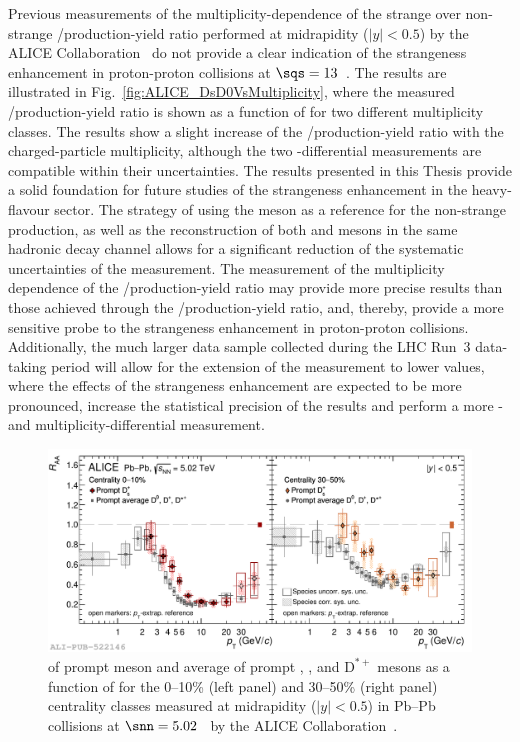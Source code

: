 Previous measurements of the multiplicity-dependence of the strange over non-strange \ds/\dz production-yield ratio performed at midrapidity ($\lvert y\rvert<0.5$) by the ALICE Collaboration~\cite{ALICE:2021npz} do not provide a clear indication of the strangeness enhancement in proton-proton collisions at $\sqs=13$~\tev. The results are illustrated in Fig.~\ref{fig:ALICE_DsD0VsMultiplicity}, where the measured \ds/\dz production-yield ratio is shown as a function of \pt for two different multiplicity classes. The results show a slight increase of the \ds/\dz production-yield ratio with the charged-particle multiplicity, although the two \pt-differential measurements are compatible within their uncertainties. The results presented in this Thesis provide a solid foundation for future studies of the strangeness enhancement in the heavy-flavour sector. The strategy of using the \dpl meson as a reference for the non-strange production, as well as the reconstruction of both \ds and \dpl mesons in the same hadronic decay channel allows for a significant reduction of the systematic uncertainties of the measurement. The measurement of the multiplicity dependence of the \ds/\dpl production-yield ratio may provide more precise results than those achieved through the \ds/\dz production-yield ratio, and, thereby, provide a more sensitive probe to the strangeness enhancement in proton-proton collisions. Additionally, the much larger data sample collected during the LHC Run~3 data-taking period will allow for the extension of the measurement to lower \pt values, where the effects of the strangeness enhancement are expected to be more pronounced, increase the statistical precision of the results and perform a more \pt- and multiplicity-differential measurement.

\begin{figure}[tb]
    \centering
    \includegraphics[width=\textwidth]{Figures/Chapter 9/PromptDs_vs_PromptD_Raa_2pads_1.pdf}
    \caption{\raa of prompt \ds meson and average \raa of prompt \dz, \dpl, and $\mathrm{D^{*+}}$ mesons as a function of \pt for the 0--10\% (left panel) and 30--50\% (right panel) centrality classes measured at midrapidity ($\lvert y\rvert<0.5$) in Pb--Pb collisions at \mbox{$\snn=5.02$~\tev} by the ALICE Collaboration~\cite{ALICE:2021npz}.}
    \label{fig:RAA_Ds}
\end{figure}

